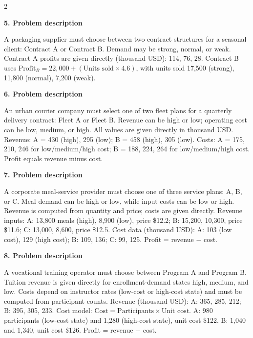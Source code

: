 \documentclass[12pt]{article}
\newcommand{\SubsectionBox}[1]{%
	\noindent\colorbox{gray!30}{%
		\parbox{\dimexpr\linewidth-2\fboxsep\relax}{\textbf{#1}}%
	}\par\vspace{0.35cm}%
}
\begin{document}
\begin{multicols}{2}
		\vspace{0.25cm}
		\SubsectionBox{5. Problem description}\vspace{-0.25cm}
		A packaging supplier must choose between two contract structures for a seasonal client:
				Contract A or Contract B. Demand may be strong, normal, or weak.
				Contract A profits are given directly (thousand USD): 114, 76, 28.
				Contract B uses
				\(\text{Profit}_B=22{,}000+(\text{Units sold}\times4.6)\),
				with units sold 17{,}500 (strong), 11{,}800 (normal), 7{,}200 (weak).

		\vspace{0.25cm}
		\SubsectionBox{6. Problem description}\vspace{-0.25cm}
		An urban courier company must select one of two fleet plans for a quarterly delivery contract:
				Fleet A or Fleet B.
				Revenue can be high or low; operating cost can be low, medium, or high.
				All values are given directly in thousand USD.
				Revenue: A = 430 (high), 295 (low); B = 458 (high), 305 (low).
				Costs: A = 175, 210, 246 for low/medium/high cost;
				B = 188, 224, 264 for low/medium/high cost.
				Profit equals revenue minus cost.

		\vspace{0.25cm}
		\SubsectionBox{7. Problem description}\vspace{-0.25cm}
		A corporate meal-service provider must choose one of three service plans: A, B, or C.
				Meal demand can be high or low, while input costs can be low or high.
				Revenue is computed from quantity and price; costs are given directly.
				Revenue inputs:
				A: 13{,}800 meals (high), 8{,}900 (low), price \$12.2;
				B: 15{,}200, 10{,}300, price \$11.6;
				C: 13{,}000, 8{,}600, price \$12.5.
				Cost data (thousand USD):
				A: 103 (low cost), 129 (high cost);
				B: 109, 136;
				C: 99, 125.
				Profit = revenue $-$ cost.

		\vspace{0.25cm}
		\SubsectionBox{8. Problem description}\vspace{-0.25cm}
		A vocational training operator must choose between Program A and Program B.
				Tuition revenue is given directly for enrollment-demand states high, medium, and low.
				Costs depend on instructor rates (low-cost or high-cost state) and must be computed from participant counts.
				Revenue (thousand USD):
				A: 365, 285, 212;
				B: 395, 305, 233.
				Cost model: \(\text{Cost}=\text{Participants}\times\text{Unit cost}\).
				A: 980 participants (low-cost state) and 1{,}280 (high-cost state), unit cost \$122.
				B: 1{,}040 and 1{,}340, unit cost \$126.
				Profit = revenue $-$ cost.


\end{multicols}
\end{document}
